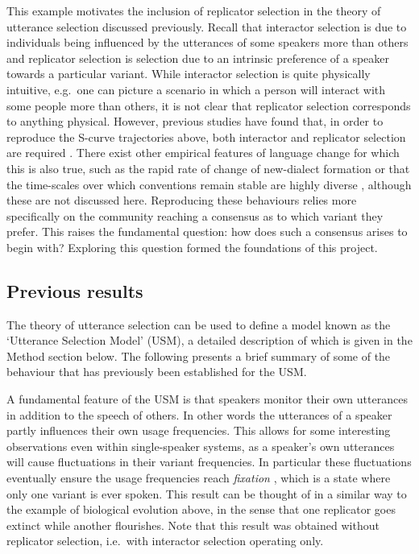 \documentclass[12pt]{article}
\begin{document}
This example motivates the inclusion of replicator selection in the theory of utterance selection discussed previously. Recall that interactor selection is due to individuals being influenced by the utterances of some speakers more than others and replicator selection is selection due to an intrinsic preference of a speaker towards a particular variant. While interactor selection is quite physically intuitive, e.g.\ one can picture a scenario in which a person will interact with some people more than others, it is not clear that replicator selection corresponds to anything physical. However, previous studies have found that, in order to reproduce the S-curve trajectories above, both interactor and replicator selection are required \cite{ref2}. There exist other empirical features of language change for which this is also true, such as the rapid rate of change of new-dialect formation \cite{ref1} or that the time-scales over which conventions remain stable are highly diverse \cite{ref3}, although these are not discussed here. Reproducing these behaviours relies more specifically on the community reaching a consensus as to which variant they prefer. This raises the fundamental question: how does such a consensus arises to begin with? Exploring this question formed the foundations of this project.

\subsection{Previous results}
The theory of utterance selection can be used to define a model known as the `Utterance Selection Model' (USM), a detailed description of which is given in the Method section below. The following presents a brief summary of some of the behaviour that has previously been established for the USM. 

A fundamental feature of the USM is that speakers monitor their own utterances in addition to the speech of others. In other words the utterances of a speaker partly influences their own usage frequencies. This allows for some interesting observations even within single-speaker systems, as a speaker's own utterances will cause fluctuations in their variant frequencies. In particular these fluctuations eventually ensure the usage frequencies reach \emph{fixation} \cite{USM}, which is a state where only one variant is ever spoken. This result can be thought of in a similar way to the example of biological evolution above, in the sense that one replicator goes extinct while another flourishes. Note that this result was obtained without replicator selection, i.e.\ with interactor selection operating only. 
\end{document}
